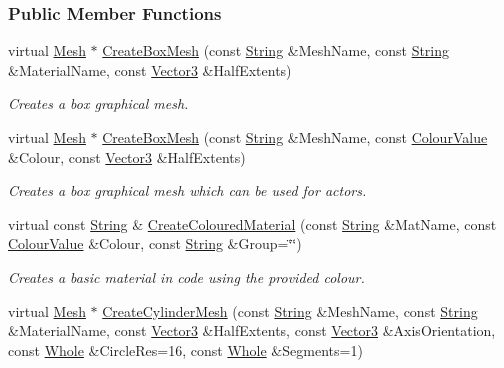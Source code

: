 \subsubsection*{Public Member Functions}
\begin{DoxyCompactItemize}
\item 
virtual \hyperlink{classMezzanine_1_1Mesh}{Mesh} $\ast$ \hyperlink{classMezzanine_1_1MeshManager_a5aa5da93359614b3e3a6b8ee955ff4d4}{CreateBoxMesh} (const \hyperlink{namespaceMezzanine_acf9fcc130e6ebf08e3d8491aebcf1c86}{String} \&MeshName, const \hyperlink{namespaceMezzanine_acf9fcc130e6ebf08e3d8491aebcf1c86}{String} \&MaterialName, const \hyperlink{classMezzanine_1_1Vector3}{Vector3} \&HalfExtents)
\begin{DoxyCompactList}\small\item\em Creates a box graphical mesh. \item\end{DoxyCompactList}\item 
virtual \hyperlink{classMezzanine_1_1Mesh}{Mesh} $\ast$ \hyperlink{classMezzanine_1_1MeshManager_a60d997162457cb7281c0fdfa37f95ee4}{CreateBoxMesh} (const \hyperlink{namespaceMezzanine_acf9fcc130e6ebf08e3d8491aebcf1c86}{String} \&MeshName, const \hyperlink{classMezzanine_1_1ColourValue}{ColourValue} \&Colour, const \hyperlink{classMezzanine_1_1Vector3}{Vector3} \&HalfExtents)
\begin{DoxyCompactList}\small\item\em Creates a box graphical mesh which can be used for actors. \item\end{DoxyCompactList}\item 
virtual const \hyperlink{namespaceMezzanine_acf9fcc130e6ebf08e3d8491aebcf1c86}{String} \& \hyperlink{classMezzanine_1_1MeshManager_aabf94057016ff9ad8de101f5189713fd}{CreateColouredMaterial} (const \hyperlink{namespaceMezzanine_acf9fcc130e6ebf08e3d8491aebcf1c86}{String} \&MatName, const \hyperlink{classMezzanine_1_1ColourValue}{ColourValue} \&Colour, const \hyperlink{namespaceMezzanine_acf9fcc130e6ebf08e3d8491aebcf1c86}{String} \&Group=\char`\"{}\char`\"{})
\begin{DoxyCompactList}\small\item\em Creates a basic material in code using the provided colour. \item\end{DoxyCompactList}\item 
virtual \hyperlink{classMezzanine_1_1Mesh}{Mesh} $\ast$ \hyperlink{classMezzanine_1_1MeshManager_a6de2e01b43302a9439dc01c1dcc90f4c}{CreateCylinderMesh} (const \hyperlink{namespaceMezzanine_acf9fcc130e6ebf08e3d8491aebcf1c86}{String} \&MeshName, const \hyperlink{namespaceMezzanine_acf9fcc130e6ebf08e3d8491aebcf1c86}{String} \&MaterialName, const \hyperlink{classMezzanine_1_1Vector3}{Vector3} \&HalfExtents, const \hyperlink{classMezzanine_1_1Vector3}{Vector3} \&AxisOrientation, const \hyperlink{namespaceMezzanine_adcbb6ce6d1eb4379d109e51171e2e493}{Whole} \&CircleRes=16, const \hyperlink{namespaceMezzanine_adcbb6ce6d1eb4379d109e51171e2e493}{Whole} \&Segments=1)

\end{DoxyCompactItemize}
